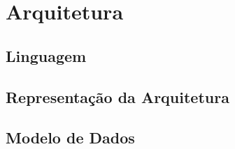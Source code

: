 \section{Arquitetura}

\subsection{Linguagem}

\subsection{Representação da Arquitetura}

\subsection{Modelo de Dados}
